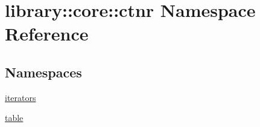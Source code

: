\hypertarget{namespacelibrary_1_1core_1_1ctnr}{}\section{library\+:\+:core\+:\+:ctnr Namespace Reference}
\label{namespacelibrary_1_1core_1_1ctnr}
\subsection*{Namespaces}
\begin{DoxyCompactItemize}
\item 
 \hyperlink{namespacelibrary_1_1core_1_1ctnr_1_1iterators}{iterators}
\item 
 \hyperlink{namespacelibrary_1_1core_1_1ctnr_1_1table}{table}
\end{DoxyCompactItemize}
